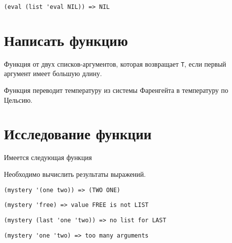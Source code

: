 \problem \hfill
\begin{lstlisting}
(eval (list 'eval NIL)) => NIL
\end{lstlisting}



\section{Написать функцию}

\problem Функция от двух списков-аргументов, которая возвращает \verb|T|, если первый аргумент имеет большую длину.



\problem Функция переводит температуру из системы Фаренгейта в температуру по Цельсию.




\section{Исследование функции}

Имеется следующая функция


\noindent
Необходимо вычислить результаты выражений.


\problem \hfill
\begin{lstlisting}
(mystery '(one two)) => (TWO ONE)
\end{lstlisting}


\problem \hfill
\begin{lstlisting}
(mystery 'free) => value FREE is not LIST
\end{lstlisting}


\problem \hfill
\begin{lstlisting}
(mystery (last 'one 'two)) => no list for LAST
\end{lstlisting}


\problem \hfill
\begin{lstlisting}
(mystery 'one 'two) => too many arguments
\end{lstlisting}